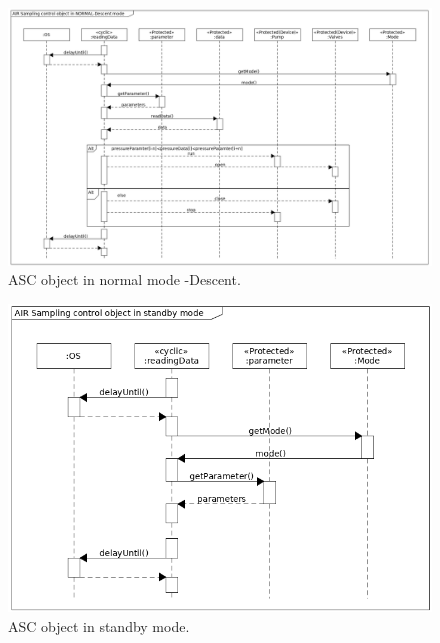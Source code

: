 \documentclass[a4paper,12pt,twoside]{article}
\providecommand{\DIFaddend}{} %
\providecommand{\DIFaddbeginFL}{} %
\providecommand{\DIFaddendFL}{} %
\providecommand{\DIFdelbeginFL}{} %
\providecommand{\DIFdelendFL}{} %
\newcommand{\DIFscaledelfig}{0.5}
\newlength{\DIFdelgraphicswidth} %
\newlength{\DIFdelgraphicsheight} %
\newcommand{\DIFaddincludegraphics}[2][]{{\color{blue}\fbox{\DIFOincludegraphics[#1]{#2}}}} %
\newcommand{\DIFdelincludegraphics}[2][]{%
\sbox{\DIFdelgraphicsbox}{\DIFOincludegraphics[#1]{#2}}%
\settoboxwidth{\DIFdelgraphicswidth}{\DIFdelgraphicsbox} %
\settoboxtotalheight{\DIFdelgraphicsheight}{\DIFdelgraphicsbox} %
\scalebox{\DIFscaledelfig}{%
\parbox[b]{\DIFdelgraphicswidth}{\usebox{\DIFdelgraphicsbox}\\[-\baselineskip] \rule{\DIFdelgraphicswidth}{0em}}\llap{\resizebox{\DIFdelgraphicswidth}{\DIFdelgraphicsheight}{%
\setlength{\unitlength}{\DIFdelgraphicswidth}%
\begin{picture}(1,1)%
\thicklines\linethickness{2pt} %
{\color[rgb]{1,0,0}\put(0,0){\framebox(1,1){}}}%
{\color[rgb]{1,0,0}\put(0,0){\line( 1,1){1}}}%
{\color[rgb]{1,0,0}\put(0,1){\line(1,-1){1}}}%
\end{picture}%
}\hspace*{3pt}}} %
} %
\DeclareRobustCommand{\DIFaddend}{\DIFOaddend \let\includegraphics\DIFOincludegraphics} %
\DeclareRobustCommand{\DIFaddbeginFL}{\DIFOaddbeginFL \let\includegraphics\DIFaddincludegraphics} %
\DeclareRobustCommand{\DIFaddendFL}{\DIFOaddendFL \let\includegraphics\DIFOincludegraphics} %
\DeclareRobustCommand{\DIFdelbeginFL}{\DIFOdelbeginFL \let\includegraphics\DIFdelincludegraphics} %
\DeclareRobustCommand{\DIFdelendFL}{\DIFOaddendFL \let\includegraphics\DIFOincludegraphics} %
\begin{document}
\begin{landscape}
\DIFaddend \begin{figure}[H]
    \centering
    \DIFdelbeginFL %
\DIFdelendFL \DIFaddbeginFL \includegraphics[height=0.9\textwidth]{appendix/img/ASC-seq-dia-v1-2-b.png}
    \DIFaddendFL \caption{ASC object in normal mode -Descent.}
    \label{ASCb}
\end{figure}
\begin{figure}[H]
    \centering
    \DIFdelbeginFL %
\DIFdelendFL \DIFaddbeginFL \includegraphics[height=0.9\textwidth]{appendix/img/ASC-seq-dia-v1-2-c.png}
    \DIFaddendFL \caption{ASC object in standby mode.}
    \label{ASCb}
\end{figure}

\end{landscape}
\end{document}

